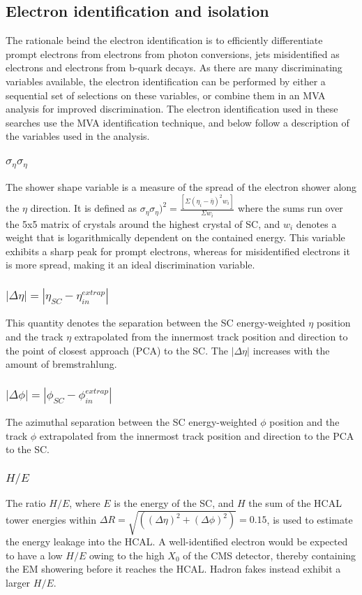 \subsection*{Electron identification and isolation}
\noindent\justify
The rationale beind the electron identification is to efficiently differentiate prompt electrons from electrons from photon conversions, jets misidentified as electrons and electrons from b-quark decays.  
As there are many discriminating variables available, the electron identification can be performed by either a sequential set of selections on these variables, or combine them in an MVA analysis for improved discrimination.
The electron identification used in these searches use the MVA identification technique, and below follow a description of the variables used in the analysis. 
\subsubsection*{$\sigma_{\eta}\sigma_{\eta}$}
\noindent\justify 
The shower shape variable is a measure of the spread of the electron shower along the $\eta$ direction.
It is defined as $\sigma_{\eta}\sigma_{\eta})^{2}=\frac{[\Sigma (\eta_i-\bar{\eta})^{2}w_i]}{\Sigma w_i}$ where the sums run over the 5x5 matrix of crystals around the highest \ET crystal of SC, and $w_i$ denotes a weight that is logarithmically dependent on the contained energy.
This variable exhibits a sharp peak for prompt electrons, whereas for misidentified electrons it is more spread, making it an ideal discrimination variable.  
\subsubsection*{$|\Delta \eta| = |\eta_{SC}-\eta_{in}^{extrap}|$}
\noindent\justify 
This quantity denotes the separation between the SC energy-weighted $\eta$ position and the track $\eta$ extrapolated from the innermost track position and direction to the point of closest approach (PCA) to the SC.
The $|\Delta \eta|$ increases with the amount of bremstrahlung. 
\subsubsection*{$|\Delta \phi| = |\phi_{SC}-\phi_{in}^{extrap}|$}
\noindent\justify 
The azimuthal separation between the SC energy-weighted $\phi$ position and the track $\phi$ extrapolated from the innermost track position and direction to the PCA to the SC.
\subsubsection*{$H/E$}
\noindent\justify  
The ratio $H/E$, where $E$ is the energy of the SC, and $H$ the sum of the HCAL tower energies within $\Delta R = \sqrt{((\Delta \eta )^{2}+ (\Delta \phi )^{2})} = 0.15$, is used to estimate the energy leakage into the HCAL. 
A well-identified electron would be expected to have a low $H/E$ owing to the high $X_0$ of the CMS detector, thereby containing the EM showering before it reaches the HCAL. 
Hadron fakes instead exhibit a larger $H/E$. 

